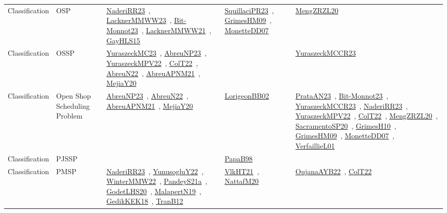 {\begin{longtable}{lp{3cm}>{\raggedright\arraybackslash}p{6cm}>{\raggedright\arraybackslash}p{6cm}>{\raggedright\arraybackslash}p{8cm}}
Classification & OSP & \href{works/NaderiRR23.pdf}{NaderiRR23}~\cite{NaderiRR23}, \href{works/LacknerMMWW23.pdf}{LacknerMMWW23}~\cite{LacknerMMWW23}, \href{works/Bit-Monnot23.pdf}{Bit-Monnot23}~\cite{Bit-Monnot23}, \href{works/LacknerMMWW21.pdf}{LacknerMMWW21}~\cite{LacknerMMWW21}, \href{works/GayHLS15.pdf}{GayHLS15}~\cite{GayHLS15} & \href{works/SquillaciPR23.pdf}{SquillaciPR23}~\cite{SquillaciPR23}, \href{works/GrimesHM09.pdf}{GrimesHM09}~\cite{GrimesHM09}, \href{works/MonetteDD07.pdf}{MonetteDD07}~\cite{MonetteDD07} & \href{works/MengZRZL20.pdf}{MengZRZL20}~\cite{MengZRZL20}\\
Classification & OSSP & \href{works/YuraszeckMC23.pdf}{YuraszeckMC23}~\cite{YuraszeckMC23}, \href{works/AbreuNP23.pdf}{AbreuNP23}~\cite{AbreuNP23}, \href{works/YuraszeckMPV22.pdf}{YuraszeckMPV22}~\cite{YuraszeckMPV22}, \href{works/ColT22.pdf}{ColT22}~\cite{ColT22}, \href{works/AbreuN22.pdf}{AbreuN22}~\cite{AbreuN22}, \href{works/AbreuAPNM21.pdf}{AbreuAPNM21}~\cite{AbreuAPNM21}, \href{works/MejiaY20.pdf}{MejiaY20}~\cite{MejiaY20} &  & \href{works/YuraszeckMCCR23.pdf}{YuraszeckMCCR23}~\cite{YuraszeckMCCR23}\\
Classification & Open Shop Scheduling Problem & \href{works/AbreuNP23.pdf}{AbreuNP23}~\cite{AbreuNP23}, \href{works/AbreuN22.pdf}{AbreuN22}~\cite{AbreuN22}, \href{works/AbreuAPNM21.pdf}{AbreuAPNM21}~\cite{AbreuAPNM21}, \href{works/MejiaY20.pdf}{MejiaY20}~\cite{MejiaY20} & \href{works/LorigeonBB02.pdf}{LorigeonBB02}~\cite{LorigeonBB02} & \href{works/PrataAN23.pdf}{PrataAN23}~\cite{PrataAN23}, \href{works/Bit-Monnot23.pdf}{Bit-Monnot23}~\cite{Bit-Monnot23}, \href{works/YuraszeckMCCR23.pdf}{YuraszeckMCCR23}~\cite{YuraszeckMCCR23}, \href{works/NaderiRR23.pdf}{NaderiRR23}~\cite{NaderiRR23}, \href{works/YuraszeckMPV22.pdf}{YuraszeckMPV22}~\cite{YuraszeckMPV22}, \href{works/ColT22.pdf}{ColT22}~\cite{ColT22}, \href{works/MengZRZL20.pdf}{MengZRZL20}~\cite{MengZRZL20}, \href{works/SacramentoSP20.pdf}{SacramentoSP20}~\cite{SacramentoSP20}, \href{works/GrimesH10.pdf}{GrimesH10}~\cite{GrimesH10}, \href{works/GrimesHM09.pdf}{GrimesHM09}~\cite{GrimesHM09}, \href{works/MonetteDD07.pdf}{MonetteDD07}~\cite{MonetteDD07}, \href{works/VerfaillieL01.pdf}{VerfaillieL01}~\cite{VerfaillieL01}\\
Classification & PJSSP &  & \href{works/PapaB98.pdf}{PapaB98}~\cite{PapaB98} & \\
Classification & PMSP & \href{works/NaderiRR23.pdf}{NaderiRR23}~\cite{NaderiRR23}, \href{works/YunusogluY22.pdf}{YunusogluY22}~\cite{YunusogluY22}, \href{works/WinterMMW22.pdf}{WinterMMW22}~\cite{WinterMMW22}, \href{works/PandeyS21a.pdf}{PandeyS21a}~\cite{PandeyS21a}, \href{works/GodetLHS20.pdf}{GodetLHS20}~\cite{GodetLHS20}, \href{works/MalapertN19.pdf}{MalapertN19}~\cite{MalapertN19}, \href{works/GedikKEK18.pdf}{GedikKEK18}~\cite{GedikKEK18}, \href{works/TranB12.pdf}{TranB12}~\cite{TranB12} & \href{works/VlkHT21.pdf}{VlkHT21}~\cite{VlkHT21}, \href{works/NattafM20.pdf}{NattafM20}~\cite{NattafM20} & \href{works/OujanaAYB22.pdf}{OujanaAYB22}~\cite{OujanaAYB22}, \href{works/ColT22.pdf}{ColT22}~\cite{ColT22}\\

\end{longtable}}
